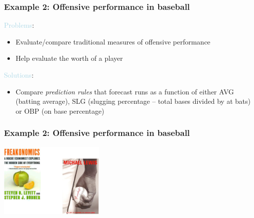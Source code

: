 \documentclass{beamer}
\newcommand{\bo}[1]{\textcolor{burntorange}{#1}}
\newcommand{\lb}[1]{\textcolor{lightblue}{#1}}
\newcommand{\bi}{\begin{itemize}}
\newcommand{\ib}{\end{itemize}}
\newcommand{\sk}{\vspace{.5cm}}
\begin{document}
%
%




\begin{frame}
\frametitle{Example 2: Offensive performance in baseball} 


{\lb{Problems}}:
\bi
\item Evaluate/compare traditional measures of offensive performance
\item Help evaluate the worth of a player
\ib

\sk
\sk

{\lb {Solutions}}:
\bi
\item Compare {\bo{ \it prediction rules}} that forecast runs as a function of either \bo{AVG} (batting average), \bo{SLG} (slugging percentage -- {\small total bases divided by at bats}) or \bo{OBP} (on base percentage)
\ib


\end{frame}




\begin{frame}
\frametitle{Example 2: Offensive performance in baseball} 

\begin{center}
\includegraphics[width=2in]{figures/Moneyball.pdf}
\end{center}
\end{frame}
\end{document}
